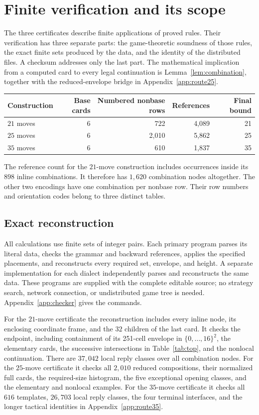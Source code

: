 \section{Finite verification and its scope}\label{sec:verification}

The three certificates describe finite applications of proved rules.
Their verification has three separate parts: the game-theoretic
soundness of those rules, the exact finite sets produced by the data,
and the identity of the distributed files. A checksum addresses only
the last part. The mathematical implication from a computed card to
every legal continuation is Lemma~\ref{lem:combination}, together with
the reduced-envelope bridge in Appendix~\ref{app:route25}.

\begin{center}
\begin{tabular}{lrrrr}
\toprule
Construction & Base cards & Numbered nonbase rows & References & Final bound\\
\midrule
$21$ moves & 6 & 722 & 4,089 & 21\\
$25$ moves & 6 & 2,010 & 5,862 & 25\\
$35$ moves & 6 & 610 & 1,837 & 35\\
\bottomrule
\end{tabular}
\end{center}
The reference count for the $21$-move construction includes occurrences
inside its $898$ inline combinations. It therefore has $1,620$
combination nodes altogether. The other two encodings have one
combination per nonbase row. Their row numbers and orientation codes
belong to three distinct tables.

\subsection{Exact reconstruction}

All calculations use finite sets of integer pairs. Each primary
program parses its literal data, checks the grammar and backward
references, applies the specified placements, and reconstructs every
required set, envelope, and height. A separate implementation for
each dialect independently parses and reconstructs the same data.
These programs are supplied with the complete editable source; no
strategy search, network connection, or undistributed game tree is
needed. Appendix~\ref{app:checker} gives the commands.

For the $21$-move certificate the reconstruction includes every inline
node, its enclosing coordinate frame, and the $32$ children of the
last card. It checks the endpoint, including containment of its
251-cell envelope in $\{0,\ldots,16\}^2$, the elementary cards, the
successive intersections in Table~\ref{tab:top}, and the nonlocal
continuation. There are $37,042$ local reply classes over all
combination nodes. For the $25$-move certificate it checks all
$2,010$ reduced compositions, their normalized full cards, the
required-size histogram, the five exceptional opening classes,
and the elementary and nonlocal examples. For the $35$-move
certificate it checks all $616$ templates, $26,703$ local reply
classes, the four terminal interfaces, and the longer tactical
identities in Appendix~\ref{app:route35}.

